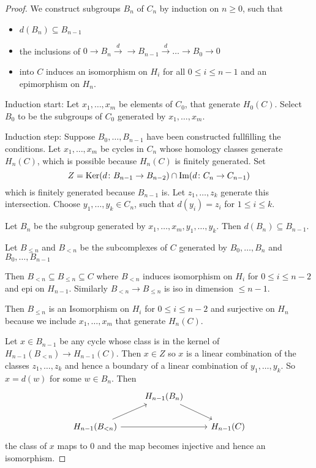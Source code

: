 \documentclass[language=english]{TemplateLecture}
\begin{document}
\begin{proof}
    We construct subgroups \(B_n\) of \(C_n\) by induction on \(n \geq 0\), such that
    \begin{itemize}
        \item     \(d(B_n) \subseteq B_{n-1}\)
        \item the inclusions of \(0 \to B_n \xrightarrow{d} \to B_{n-1} \xrightarrow{d} \dots \to B_0 \to 0\)
        \item into \(C\) induces an isomorphism on \(H_i\) for all \(0 \leq i \leq n-1\) and an epimorphism on \(H_n\).
    \end{itemize} 

    Induction start: Let \(x_1, \dots, x_m\) be elements of \(C_0\), that generate \(H_0(C)\). Select \(B_0\) to be the subgroups of \(C_0\) generated by \(x_1, \dots, x_m\).

    Induction step: Suppose \(B_0, \dots, B_{n-1}\) have been constructed fullfilling the conditions.
    Let \(x_1, \dots, x_m\) be cycles in \(C_n\) whose homology classes generate \(H_n(C)\), which is possible because \(H_n(C)\) is finitely generated. Set
    \[Z = \operatorname{Ker}(d\colon B_{n-1} \to B_{n-2}) \cap \operatorname{Im}(d\colon C_n \to C_{n-1})\]
    which is finitely generated because \(B_{n-1}\) is. Let \(z_1, \dots, z_k\) generate this intersection. Choose \(y_1, \dots, y_k \in C_n\), such that \(d(y_i) = z_i\) for \(1 \leq i \leq k\).

    Let \(B_n\) be the subgroup generated by \(x_1, \dots, x_m, y_1, \dots, y_k\). Then \(d(B_n) \subseteq B_{n-1}\).

    Let \(B_{\leq n}\) and \(B_{< n}\) be the subcomplexes of \(C\) generated by \(B_0, \dots, B_n\) and \(B_0, \dots, B_{n-1}\)

    Then \(B_{<n} \subseteq B_{\leq n} \subseteq C\) where \(B_{ < n}\) induces isomorphism on \(H_i\) for \(0 \leq i \leq n-2\) and epi on \(H_{n-1}\). Similarly \(B_{<n} \to B_{\leq n}\) is iso in dimension \(\leq n-1\).

    Then \(B_{\leq n}\) is an Isomorphism on \(H_i\) for \(0 \leq i \leq n-2\) and surjective on \(H_n\) because we include \(x_1, \dots, x_m\) that generate \(H_n(C)\).

    Let \(x \in B_{n-1}\) be any cycle whose class is in the kernel of \(H_{n-1}(B_{<n}) \to H_{n-1}(C)\). Then \(x \in Z\) so \(x\) is a linear combination of the classes \(z_1, \dots, z_k\) and hence a boundary of a linear combination of \(y_1, \dots, y_k\). So \(x = d(w)\) for some \(w \in B_n\). Then 
    \[\begin{tikzcd}
        &H_{n-1}(B_n) \ar[rd] & \\
        H_{n-1}(B_{<n}) \ar[ru] \ar[rr]& & H_{n-1}(C)
    \end{tikzcd}\]
    the class of \(x\) maps to 0 and the map becomes injective and hence an isomorphism.


\end{proof}
\end{document}
